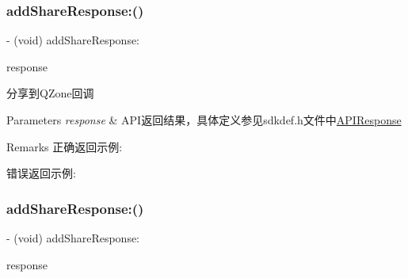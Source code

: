 \subsubsection{\texorpdfstring{add\+Share\+Response\+:()}{addShareResponse:()}\hspace{0.1cm}{\footnotesize\ttfamily [1/2]}}
{\footnotesize\ttfamily -\/ (void) add\+Share\+Response\+: \begin{DoxyParamCaption}\item[{(\mbox{\hyperlink{interface_a_p_i_response}{A\+P\+I\+Response}} $\ast$)}]{response }\end{DoxyParamCaption}\hspace{0.3cm}{\ttfamily [optional]}}

分享到\+Q\+Zone回调 
\begin{DoxyParams}{Parameters}
{\em response} & A\+P\+I返回结果，具体定义参见sdkdef.\+h文件中\mbox{\hyperlink{interface_a_p_i_response}{A\+P\+I\+Response}} \\
\hline
\end{DoxyParams}
\begin{DoxyRemark}{Remarks}
正确返回示例\+: 
\begin{DoxyCodeInclude}
\end{DoxyCodeInclude}
 错误返回示例\+: 
\begin{DoxyCodeInclude}
\end{DoxyCodeInclude}

\end{DoxyRemark}
\mbox{\label{protocol_tencent_session_delegate-p_a216d645eacd9b1e25a941ba53dc1ee02}} 
\subsubsection{\texorpdfstring{add\+Share\+Response\+:()}{addShareResponse:()}\hspace{0.1cm}{\footnotesize\ttfamily [2/2]}}
{\footnotesize\ttfamily -\/ (void) add\+Share\+Response\+: \begin{DoxyParamCaption}\item[{(\mbox{\hyperlink{interface_a_p_i_response}{A\+P\+I\+Response}} $\ast$)}]{response }\end{DoxyParamCaption}\hspace{0.3cm}{\ttfamily [optional]}}

